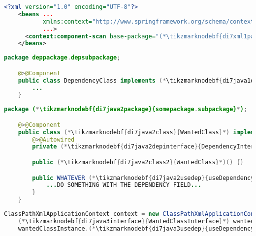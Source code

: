 \begin{lstlisting}[language=XML, title={Configuration XML}]
    <?xml version="1.0" encoding="UTF-8"?>
    <beans ...
           xmlns:context="http://www.springframework.org/schema/context"
           ...>
      <context:component-scan base-package="(*\tikzmarknodebf{di7xml1package}{somepackage.subpackage}[ForestGreen]*)"/>
    </beans>
\end{lstlisting}
\begin{lstlisting}[language=Java, title={Dependency class}]
    package deppackage.depsubpackage;

    @>@Component
    public class DependencyClass implements (*\tikzmarknodebf{di7java1depinterface}{DependencyInterface}*) {
        ...
    }
\end{lstlisting}
\begin{lstlisting}[language=Java, title={Wanted class with the zero--parameter constructor}]
    package (*\tikzmarknodebf{di7java2package}{somepackage.subpackage}*);

    @>@Component
    public class (*\tikzmarknodebf{di7java2class}{WantedClass}*) implements (*\tikzmarknodebf{di7java2interface}{WantedClassInterface}*) {
        @>@Autowired
        private (*\tikzmarknodebf{di7java2depinterface}{DependencyInterface}*) dependencyField;

        public (*\tikzmarknodebf{di7java2class2}{WantedClass}*)() {}

        public WHATEVER (*\tikzmarknodebf{di7java2usedep}{useDependency}*)() {
            ...DO SOMETHING WITH THE DEPENDENCY FIELD...
        }
    }
\end{lstlisting}
\begin{lstlisting}[language=Java, title={Usage}]
    ClassPathXmlApplicationContext context = new ClassPathXmlApplicationContext("configurationFile.xml");
    (*\tikzmarknodebf{di7java3interface}{WantedClassInterface}*) wantedClassInstance = context.getBean("(*\tikzmarknodebf{di7java3beanid}{wantedClass}[ForestGreen]*)", (*\tikzmarknodebf{di7java3interface2}{WantedClassInterface}*).class);
    wantedClassInstance.(*\tikzmarknodebf{di7java3usedep}{useDependency}*)();
\end{lstlisting}
\newpage

